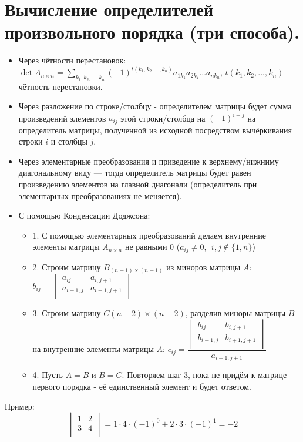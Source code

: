 \documentclass[12pt]{article}
\begin{document}
\begin{sloppypar}
    \section{Вычисление определителей произвольного порядка (три способа).}
    \begin{itemize}
        \item Через чётности перестановок: $\displaystyle \det A_{n \times n} = \sum_{k_1, k_2, ..., k_n} (-1)^{t(k_1, k_2, ..., k_n)}a_{1k_1}a_{2k_2}...a_{nk_n}$, $t(k_1, k_2, ..., k_n)$ - чётность перестановки.
        \item Через разложение по строке/столбцу - определителем матрицы будет сумма произведений элементов $a_{ij}$ этой строки/столбца на $(-1)^{i + j}$ на определитель матрицы, полученной из исходной посредством вычёркивания строки $i$ и столбцы $j$.
        \item Через элементарные преобразования и приведение к верхнему/нижниму диагональному виду — тогда определитель матрицы будет равен произведению элементов на главной диагонали (определитель при элементарных преобразованиях не меняется).
        \item С помощью Конденсации Доджсона: \begin{itemize}
                  \item 1. С помощью элементарных преобразований делаем внутренние элементы матрицы $A_{n\times n}$ не равными 0 ($a_{ij} \neq 0,\ \ i,j \notin \{1, n\}$)
                  \item 2. Строим матрицу $B_{(n - 1) \times (n - 1)}$ из миноров матрицы $A$: $b_{ij} = \begin{vmatrix}
                                a_{ij}       & a_{i, j+ 1}     \\
                                a_{i + 1, j} & a_{i + 1, j+ 1} \\
                            \end{vmatrix}$
                  \item 3. Строим матрицу $C{(n - 2) \times (n - 2)}$, разделив миноры матрицы $B$ на внутренние элементы матрицы $A$: $c_{ij} = \dfrac{\begin{vmatrix}
                                    b_{ij}       & b_{i, j + 1}     \\
                                    b_{i + 1, j} & b_{i + 1, j + 1} \\
                                \end{vmatrix}}{a_{i + 1, j + 1}}$
                  \item 4. Пусть $A=B$ и $B=C$. Повторяем шаг 3, пока не придём к матрице первого порядка - её единственный элемент и будет ответом.
              \end{itemize}
    \end{itemize}
    Пример:
    \[
        \begin{vmatrix}
            1 & 2 \\
            3 & 4 \\
        \end{vmatrix} = 1 \cdot 4 \cdot (-1)^0 + 2 \cdot 3 \cdot (-1)^1 = -2
    \]



\end{sloppypar}
\end{document}

